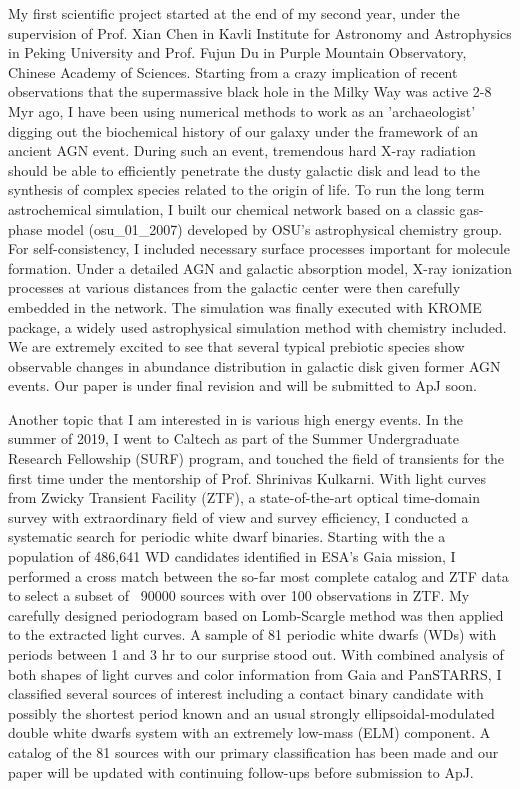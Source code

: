 \documentclass[11pt, a4paper]{awesome-cv} %
\begin{document}
\begin{cvletter}
My first scientific project started at the end of my second year, under the supervision of Prof. Xian Chen in Kavli Institute for Astronomy and Astrophysics in Peking University and Prof. Fujun Du in Purple Mountain Observatory, Chinese Academy of Sciences. Starting from a crazy implication of recent observations that the supermassive black hole in the Milky Way was active 2-8 Myr ago, I have been using numerical methods to work as an 'archaeologist' digging out the biochemical history of our galaxy under the framework of an ancient AGN event. During such an event, tremendous hard X-ray radiation should be able to efficiently penetrate the dusty galactic disk and lead to the synthesis of complex species related to the origin of life. To run the long term astrochemical simulation, I built our chemical network based on a classic gas-phase model (osu\_01\_2007) developed by OSU's astrophysical chemistry group. For self-consistency, I included necessary surface processes important for molecule formation. Under a detailed AGN and galactic absorption model, X-ray ionization processes at various distances from the galactic center were then carefully embedded in the network. The simulation was finally executed with KROME package, a widely used astrophysical simulation method with chemistry included. We are extremely excited to see that several typical prebiotic species show observable changes in abundance distribution in galactic disk given former AGN events. Our paper is under final revision and will be submitted to ApJ soon. 

Another topic that I am interested in is various high energy events. In the summer of 2019, I went to Caltech as part of the Summer Undergraduate Research Fellowship (SURF) program, and touched the field of transients for the first time under the mentorship of Prof. Shrinivas Kulkarni. With light curves from Zwicky Transient Facility (ZTF), a state-of-the-art optical time-domain survey with extraordinary field of view and survey efficiency, I conducted a systematic search for periodic white dwarf binaries. Starting with the a population of 486,641 WD candidates identified in ESA's Gaia mission, I performed a cross match between the so-far most complete catalog and ZTF data to select a subset of ~90000 sources with over 100 observations in ZTF. My carefully designed periodogram based on Lomb-Scargle method was then applied to the extracted light curves. A sample of 81 periodic white dwarfs (WDs) with periods between 1 and 3 hr to our surprise stood out. With combined analysis of both shapes of light curves and color information from Gaia and PanSTARRS, I classified several sources of interest including a contact binary candidate with possibly the shortest period known and an usual strongly ellipsoidal-modulated double white dwarfs system with an extremely low-mass (ELM) component. A catalog of the 81 sources with our primary classification has been made and our paper will be updated with continuing follow-ups before submission to ApJ.


\end{cvletter}
\end{document}
